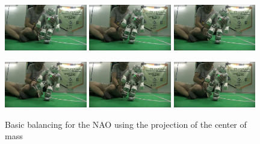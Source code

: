 \begin{figure}[!t]
\centerline{
\includegraphics[width=0.32\textwidth]{Figures/Demo2/1.png}
\includegraphics[width=0.32\textwidth]{Figures/Demo2/2.png}
\includegraphics[width=0.32\textwidth]{Figures/Demo2/3.png}
}
\vspace*{0.06cm}
\centerline{
\includegraphics[width=0.32\textwidth]{Figures/Demo2/4.png}
\includegraphics[width=0.32\textwidth]{Figures/Demo2/5.png}
\includegraphics[width=0.32\textwidth]{Figures/Demo2/6.png}
}
\caption{Basic balancing for the NAO using the projection of the center of mass}
\label{demo2}
\end{figure}
